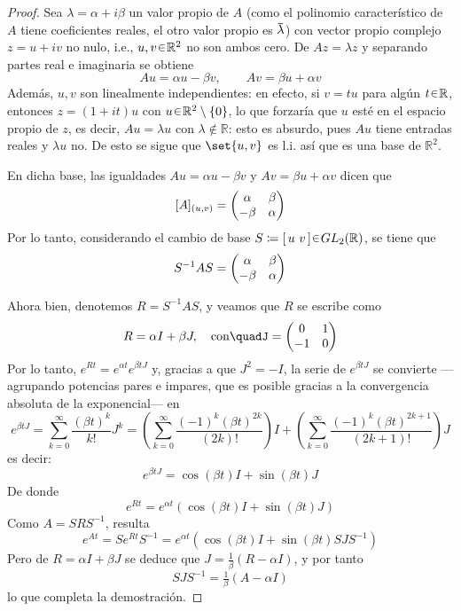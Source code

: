 \begin{proof}
Sea $\lambda=\alpha+i\beta$ un valor propio de $A$ (como el polinomio característico de $A$ tiene coeficientes reales, el otro valor propio es $\ubar{\lambda}$) con vector propio complejo $z=u+iv$ no nulo, i.e., $u,v\en\mathbb{R}^2$ no son ambos cero. De $Az=\lambda z$ y separando partes real e imaginaria se obtiene
\[
Au = \alpha u - \beta v,
\qquad
Av = \beta u + \alpha v
\]
Además, $u,v$ son linealmente independientes: en efecto, si $v=tu$ para algún $t\en\mathbb R$, entonces $z=(1+it)u$ con $u\en\mathbb R^2\setminus\{0\}$, lo que forzaría que $u$ esté en el espacio propio de $z$, es decir, $A u=\lambda u$ con $\lambda\notin\mathbb R$: esto es absurdo, pues $A u$ tiene entradas reales y $\lambda u$ no. De esto se sigue que $\set{u,v}$ es l.i. así que es una base de $\mathbb R^2$.

En dicha base, las igualdades $Au = \alpha u - \beta v$ y $Av = \beta u + \alpha v$ dicen que
\[
[A]_{(u,v)}=\mqty(\alpha & \beta \\ -\beta & \alpha)
\]
Por lo tanto, considerando el cambio de base $S \coloneq [\,u\ v\,] \en GL_2(\mathbb R)$, se tiene que
\[
S^{-1}AS=\mqty(\alpha & \beta \\ -\beta & \alpha)
\]

Ahora bien, denotemos $R = S^{-1}AS$, y veamos que $R$ se escribe como
\[
R = \alpha I + \beta J,%
\quad \text{con}\quad%
J = \mqty(0 & 1 \\ -1 & 0)
\]
Por lo tanto,
\(
e^{Rt} = e^{\alpha t} e^{\beta t J}
\)
y, gracias a que $J^2 = -I$, la serie de $e^{\beta t J}$ se convierte ---agrupando potencias pares e impares, que es posible gracias a la convergencia absoluta de la exponencial--- en 
\[
e^{\beta t J} = \sum_{k=0}^{\infty} \frac{(\beta t)^k}{k!} J^k
= \left( \sum_{k=0}^{\infty} \frac{(-1)^k (\beta t)^{2k}}{(2k)!} \right) I
+ \left( \sum_{k=0}^{\infty} \frac{(-1)^k (\beta t)^{2k+1}}{(2k+1)!} \right) J
\]
es decir:
\[
e^{\beta t J} = \cos(\beta t) I + \sin(\beta t) J
\]
De donde
\[
e^{Rt} = e^{\alpha t} \left( \cos(\beta t) I + \sin(\beta t) J \right)
\]
Como $A = S R S^{-1}$, resulta
\[
e^{At} = S e^{Rt} S^{-1} = e^{\alpha t} \left( \cos(\beta t) I + \sin(\beta t) S J S^{-1} \right)
\]
Pero de $R = \alpha I + \beta J$ se deduce que $J = \tfrac{1}{\beta}(R - \alpha I)$, y por tanto
\[
S J S^{-1} = \tfrac{1}{\beta} (A - \alpha I)
\]
lo que completa la demostración.
\end{proof}\clearpage

